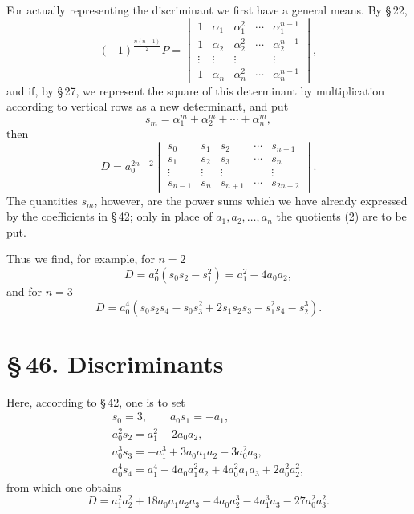 \documentclass[11pt]{article}
\providecommand{\sect}[2]{\section*{\S\,#1. #2}}
\begin{document}
For actually representing the discriminant we first have a general means. By \S\,22,
\begin{equation}
 (-1)^{\frac{n(n-1)}2}P=
 \begin{vmatrix}
 1&\alpha_1&\alpha_1^2&\cdots&\alpha_1^{n-1}\\
 1&\alpha_2&\alpha_2^2&\cdots&\alpha_2^{n-1}\\
 \vdots&\vdots&\vdots&&\vdots\\
 1&\alpha_n&\alpha_n^2&\cdots&\alpha_n^{n-1}
 \end{vmatrix},
\tag{6}
\end{equation}
and if, by \S\,27, we represent the square of this determinant by multiplication according to vertical rows as a new determinant, and put
\[
 s_m=\alpha_1^m+\alpha_2^m+\cdots+\alpha_n^m,
\]
then
\begin{equation}
 D=a_0^{2n-2}
 \begin{vmatrix}
 s_0&s_1&s_2&\cdots&s_{n-1}\\
 s_1&s_2&s_3&\cdots&s_n\\
 \vdots&\vdots&\vdots&&\vdots\\
 s_{n-1}&s_n&s_{n+1}&\cdots&s_{2n-2}
 \end{vmatrix}.
\tag{7}
\end{equation}
The quantities \(s_m\), however, are the power sums which we have already expressed by the coefficients in \S\,42; only in place of \(a_1,a_2,\ldots,a_n\) the quotients (2) are to be put.

Thus we find, for example, for \(n=2\)
\begin{equation}
 D=a_0^2(s_0s_2-s_1^2)=a_1^2-4a_0a_2,
\tag{8}
\end{equation}
and for \(n=3\)
\begin{equation}
 D=a_0^4(s_0s_2s_4-s_0s_3^2+2s_1s_2s_3-s_1^2s_4-s_2^3).
\tag{9}
\end{equation}

\sect{46}{Discriminants}

Here, according to \S\,42, one is to set
\[
\begin{gathered}
 s_0=3,\qquad a_0s_1=-a_1,\\
 a_0^2s_2=a_1^2-2a_0a_2,\\
 a_0^3s_3=-a_1^3+3a_0a_1a_2-3a_0^2a_3,\\
 a_0^4s_4=a_1^4-4a_0a_1^2a_2+4a_0^2a_1a_3+2a_0^2a_2^2,
\end{gathered}
\]
from which one obtains
\begin{equation}
D=a_1^2a_2^2+18a_0a_1a_2a_3-4a_0a_2^3-4a_1^3a_3-27a_0^2a_3^2.
\tag{10}
\end{equation}
\end{document}
